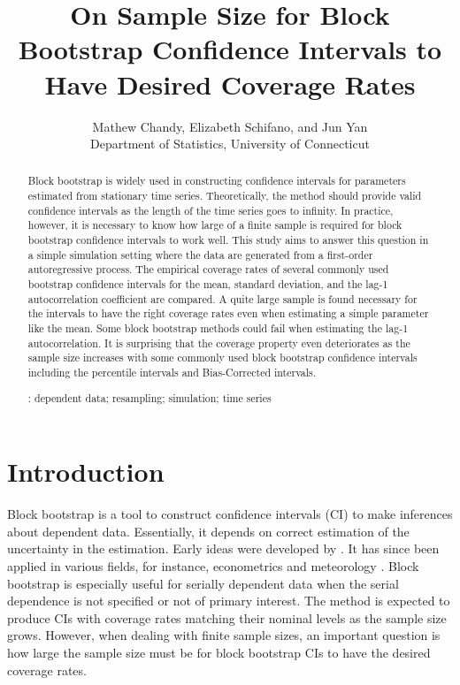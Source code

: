 \documentclass[12pt, letterpaper, titlepage]{article}
\title{On Sample Size for Block Bootstrap Confidence Intervals 
  to Have Desired Coverage Rates}
\author{Mathew Chandy, Elizabeth Schifano,
  and Jun Yan\\[1ex]
  Department of Statistics, University of Connecticut\\
}
\date{}
\begin{document}
 
\maketitle


\begin{abstract}
Block bootstrap is widely used in constructing confidence intervals for
parameters estimated from stationary time series. Theoretically, the method
should provide valid confidence intervals as the length of the time series goes
to infinity. In practice, however, it is necessary to know how large of a finite
sample is required for block bootstrap confidence intervals to work well. This
study aims to answer this question in a simple simulation setting where the data
are generated from a first-order autoregressive process. The empirical coverage
rates of several commonly used bootstrap confidence intervals for the mean,
standard deviation, and the lag-1 autocorrelation coefficient are compared.
A quite large sample is found necessary for the intervals to have the right
coverage rates even when estimating a simple parameter like the mean. Some
block bootstrap methods could fail when estimating the lag-1 autocorrelation.
It is surprising that the coverage property even deteriorates as the sample size
increases with some commonly used block bootstrap confidence intervals
including the percentile intervals and Bias-Corrected intervals.


\bigskip
{}:
dependent data; resampling; simulation; time series
\end{abstract}


\doublespace


\section{Introduction}
\label{sec:intro}


Block bootstrap is a tool to construct confidence intervals (CI)
to make inferences about dependent data. Essentially, it depends on correct
estimation of the uncertainty in the estimation. Early ideas were developed
by \citet{hall1985resampling, carlstein1986use,kunsch1989jackknife}.
It has since been applied in various fields, for instance, econometrics
\citep{mackinnon2006bootstrap} and meteorology \citep{varga2017generalised}.
Block bootstrap is especially useful for serially dependent
data when the serial dependence is not specified or not of primary interest.
The method is expected to produce CIs with coverage rates
matching their nominal levels as the sample size grows. However,
when dealing with finite sample sizes, an important question is how large the
sample size must be for block bootstrap CIs to have the
desired coverage rates.
\end{document}
